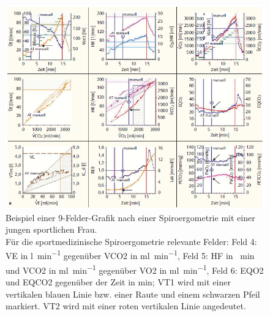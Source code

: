\begin{figure}[H]
	\centering
	\includegraphics[width=\textwidth]{Bilder/9fieldcomplex.png}
	\caption[Beispielhafte 9-Felder-Grafik nach einer Spiroergometrie]{Beispiel einer 9-Felder-Grafik nach einer Spiroergometrie mit einer jungen sportlichen Frau.\\
	Für die sportmedizinische Spiroergometrie relevante Felder: Feld 4: \gls{VE} in \si{\litre\per\minute} gegenüber \gls{VCO2} in \si{\milli\litre\per\minute}, Feld 5: \gls{HF} in \si{\per\minute} und \gls{VCO2} in \si{\milli\litre\per\minute} gegenüber \gls{VO2} in \si{\milli\litre\per\minute}, Feld 6: \gls{EQO2} und \gls{EQCO2} gegenüber der Zeit in \si{\minute}; VT1 wird mit einer vertikalen blauen Linie bzw. einer Raute und einem schwarzen Pfeil markiert. VT2 wird mit einer roten vertikalen Linie angedeutet.~\cite{Kroidl.2015}}
	\label{pic:pic2}
\end{figure}
%
